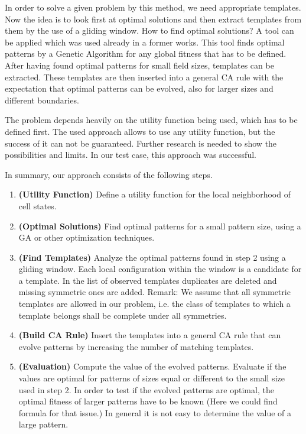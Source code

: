 \documentclass[10pt,a4paper]{article}  %
\begin{document}
In order to solve a given problem by this method, we need appropriate templates.
Now the idea is to look first at optimal solutions and then extract templates from them by the use of a gliding window.
How to find optimal solutions? 
A tool can be applied which was  used already in a former works.
This tool finds optimal patterns by a Genetic Algorithm for any global fitness that has to be defined.
After having found optimal patterns for small field sizes, templates can be extracted.
These templates are then inserted into a general CA rule with the expectation that optimal patterns can be evolved, also for larger sizes and different boundaries.

The problem depends heavily on the utility function being used, which has to be defined first.
The used approach allows to use any utility function, but the success of it can not be guaranteed.
Further research is needed to show the possibilities and limits. %
In our test case, this approach was successful. 


In summary, our approach  consists of the following steps.

\begin{enumerate}
	\item%
   \textbf{(Utility Function)} Define a utility function for the local neighborhood of cell states.

  \item%
  \textbf{(Optimal Solutions)} Find optimal patterns for a small pattern size, using a GA or other optimization techniques.
  
  \item %
  \textbf{(Find Templates)} Analyze the optimal patterns found in step 2 using a gliding window. Each local configuration within the window is a candidate for a template.
  In the list of observed templates duplicates are deleted and missing symmetric ones are added.
  Remark: We assume that all symmetric templates are allowed in our problem, 
  i.e. the class of templates to which a template belongs shall be complete under
  all symmetries.  
  
  \item %
  \textbf{(Build CA Rule)} Insert the templates into a general CA rule that can evolve patterns by
  increasing the number of matching templates. 
  
  \item %
  \textbf{(Evaluation)} Compute the value of the evolved patterns. Evaluate if the values are optimal
  for patterns of sizes equal or different to the small size used in step 2. 
  In order to test if the evolved patterns are optimal,
  the optimal fitness of larger patterns have to be known 
  (Here we could find formula for that issue.)
  In general it is not easy to determine the value of a large pattern.
  
  
\end{enumerate}  
\end{document}
